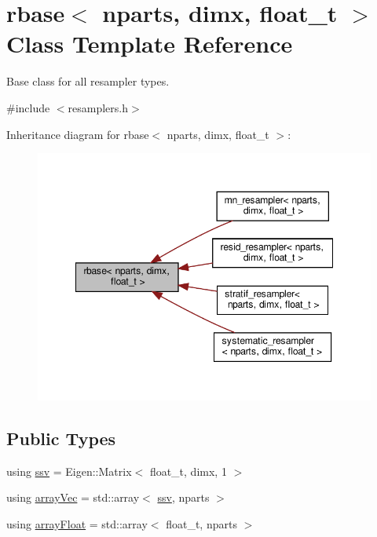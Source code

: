 \hypertarget{classrbase}{}\section{rbase$<$ nparts, dimx, float\+\_\+t $>$ Class Template Reference}
\label{classrbase}


Base class for all resampler types.  




{\ttfamily \#include $<$resamplers.\+h$>$}



Inheritance diagram for rbase$<$ nparts, dimx, float\+\_\+t $>$\+:
\nopagebreak
\begin{figure}[H]
\begin{center}
\leavevmode
\includegraphics[width=348pt]{classrbase__inherit__graph}
\end{center}
\end{figure}
\subsection*{Public Types}
\begin{DoxyCompactItemize}
\item 
using \hyperlink{classrbase_ae20e0b8df15aa109252f57ecbf1f20f8}{ssv} = Eigen\+::\+Matrix$<$ float\+\_\+t, dimx, 1 $>$
\item 
using \hyperlink{classrbase_aa12fc826befa6ba0647b5f59ebc396ee}{array\+Vec} = std\+::array$<$ \hyperlink{classrbase_ae20e0b8df15aa109252f57ecbf1f20f8}{ssv}, nparts $>$
\item 
using \hyperlink{classrbase_a6f76bef853e508cb5b6f546d231b06f5}{array\+Float} = std\+::array$<$ float\+\_\+t, nparts $>$
\end{DoxyCompactItemize}
